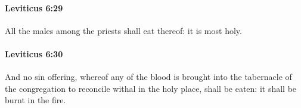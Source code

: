 		\paragraph{Leviticus 6:29} %
			\label{LEVITICUS-6-29}

			All the males among the priests shall eat thereof: it is most holy.


		\paragraph{Leviticus 6:30} %
			\label{LEVITICUS-6-30}

			And no sin offering, whereof any of the blood is brought into the tabernacle of the congregation to reconcile withal in the holy place, shall be eaten: it shall be burnt in the fire.


